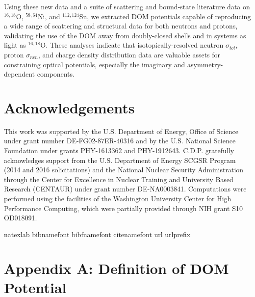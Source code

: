 \documentclass[twocolumn,secnumarabic,amssymb, nobibnotes, aps, prl,
superscriptaddress, nobalancelastpage, draft]{revtex4}
\newcommand{\tot}{\ensuremath{\sigma_{tot}}}
\newcommand{\rxn}{\ensuremath{\sigma_{rxn}}}
\newcommand{\oSixEight}{\ensuremath{^{16,18}}O}
\newcommand{\niEightFour}{\ensuremath{^{58,64}}N\lowercase{i}}
\newcommand{\snTwelveFour}{\ensuremath{^{112,124}}S\lowercase{n}}
\begin{document}
Using these new data and a suite of scattering and bound-state literature data
on \oSixEight, \niEightFour, and \snTwelveFour,
we extracted DOM potentials capable of reproducing a wide range of scattering
and structural data for both neutrons and protons, validating the use of the
DOM away from doubly-closed shells and in systems as light as \oSixEight.
These analyses indicate that isotopically-resolved neutron \tot,
proton \rxn, and charge density distribution data are valuable assets for
constraining optical potentials, especially the imaginary and
asymmetry-dependent components.

\section{Acknowledgements}
This work was supported by the U.S. Department of Energy, Office of Science under grant number
DE-FG02-87ER-40316 and by the U.S. National Science Foundation under grants
PHY-1613362 and PHY-1912643. C.D.P. gratefully acknowledges support from the
U.S. Department of Energy SCGSR Program (2014 and 2016 solicitations) and the
National Nuclear Security Administration through the Center for Excellence in Nuclear
Training and University Based Research (CENTAUR) under grant number DE-NA0003841.
Computations were performed using the facilities of the Washington University
Center for High Performance Computing, which were partially provided through NIH
grant S10 OD018091. 


\begin{thebibliography}{32} \expandafter\ifx\csname
        natexlab\endcsname\relax\def\natexlab#1{#1}\fi \expandafter\ifx\csname
        bibnamefont\endcsname\relax \def\bibnamefont#1{#1}\fi
        \expandafter\ifx\csname bibfnamefont\endcsname\relax
        \def\bibfnamefont#1{#1}\fi \expandafter\ifx\csname
        citenamefont\endcsname\relax \def\citenamefont#1{#1}\fi
        \expandafter\ifx\csname url\endcsname\relax \def\url#1{\texttt{#1}}\fi
        \expandafter\ifx\csname urlprefix\endcsname\relax\def\urlprefix{URL
        }\fi \providecommand{\bibinfo}[2]{#2}
        \providecommand{\eprint}[2][]{\url{#2}}
\end{thebibliography}

\clearpage
\appendix \label{DOMFunctionalForms}
\section{Appendix A: Definition of DOM Potential}
\end{document}
